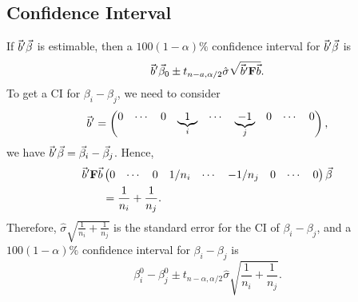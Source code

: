 \subsection*{Confidence Interval}
If $ \vec{b}'\vec{\beta} $ is estimable, then a $ 100(1-\alpha)\% $
confidence interval for $ \vec{b}'\vec{\beta} $ is
\[ \vec{b}'\vec{\beta}_0\pm t_{n-a,\alpha/2}\hat{\sigma}\sqrt{\vec{b}'\mathbf{F}\vec{b}}. \]
To get a CI for $ \beta_i-\beta_j $, we need to consider
\[ \vec{b}'=\begin{pmatrix}
        0 & \cdots & 0 & \underbrace{1}_i & \cdots & \underbrace{-1}_{j} & 0 & \cdots & 0
    \end{pmatrix}, \]
we have $ \vec{b}'\vec{\beta}=\vec{\beta}_i-\vec{\beta}_j $. Hence,
\begin{align*}
    \vec{b}'\mathbf{F}\vec{b}
     & \begin{pmatrix}
           0 & \cdots & 0 & 1/n_i & \cdots & -1/n_j & 0 & \cdots & 0
       \end{pmatrix}\vec{\beta} \\
     & =\frac{1}{n_i}+\frac{1}{n_j}.
\end{align*}
Therefore, $ \hat{\sigma}\sqrt{\frac{1}{n_i}+\frac{1}{n_j}} $ is the standard
error for the CI of $ \beta_i-\beta_j $, and a $ 100(1-\alpha)\% $ confidence
interval for $ \beta_i-\beta_j $ is
\[ \beta_i^0-\beta_j^0\pm t_{n-\alpha,\alpha/2}\hat{\sigma}\sqrt{\frac{1}{n_i}+\frac{1}{n_j}}. \]
